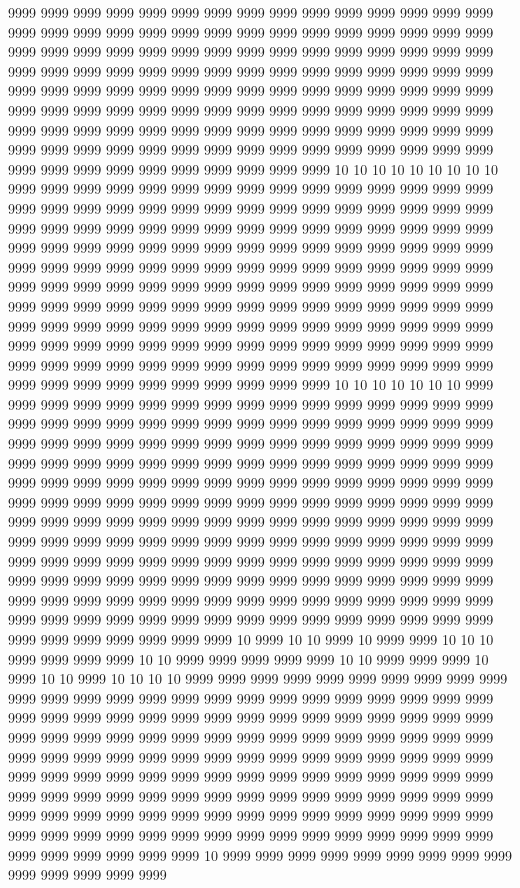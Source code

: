 9999 9999 9999 9999 9999 9999 9999 9999 9999 9999 9999 9999 9999 9999 9999 9999 9999 9999 9999 9999 9999 9999 9999 9999 9999 9999 9999 9999 9999 9999 9999 9999 9999 9999 9999 9999 9999 9999 9999 9999 9999 9999 9999 9999 9999 9999 9999 9999 9999 9999 9999 9999 9999 9999 9999 9999 9999 9999 9999 9999 9999 9999 9999 9999 9999 9999 9999 9999 9999 9999 9999 9999 9999 9999 9999 9999 9999 9999 9999 9999 9999 9999 9999 9999 9999 9999 9999 9999 9999 9999 9999 9999 9999 9999 9999 9999 9999 9999 9999 9999 9999 9999 9999 9999 9999 9999 9999 9999 9999 9999 9999 9999 9999 9999 9999 9999 9999 9999 9999 9999 9999 9999 9999 9999 9999 9999 9999 9999 9999 9999 10 10 10 10 10 10 10 10 10 9999 9999 9999 9999 9999 9999 9999 9999 9999 9999 9999 9999 9999 9999 9999 9999 9999 9999 9999 9999 9999 9999 9999 9999 9999 9999 9999 9999 9999 9999 9999 9999 9999 9999 9999 9999 9999 9999 9999 9999 9999 9999 9999 9999 9999 9999 9999 9999 9999 9999 9999 9999 9999 9999 9999 9999 9999 9999 9999 9999 9999 9999 9999 9999 9999 9999 9999 9999 9999 9999 9999 9999 9999 9999 9999 9999 9999 9999 9999 9999 9999 9999 9999 9999 9999 9999 9999 9999 9999 9999 9999 9999 9999 9999 9999 9999 9999 9999 9999 9999 9999 9999 9999 9999 9999 9999 9999 9999 9999 9999 9999 9999 9999 9999 9999 9999 9999 9999 9999 9999 9999 9999 9999 9999 9999 9999 9999 9999 9999 9999 9999 9999 9999 9999 9999 9999 9999 9999 9999 9999 9999 9999 9999 9999 9999 9999 9999 9999 9999 9999 9999 9999 9999 9999 9999 9999 9999 9999 9999 9999 10 10 10 10 10 10 10 9999 9999 9999 9999 9999 9999 9999 9999 9999 9999 9999 9999 9999 9999 9999 9999 9999 9999 9999 9999 9999 9999 9999 9999 9999 9999 9999 9999 9999 9999 9999 9999 9999 9999 9999 9999 9999 9999 9999 9999 9999 9999 9999 9999 9999 9999 9999 9999 9999 9999 9999 9999 9999 9999 9999 9999 9999 9999 9999 9999 9999 9999 9999 9999 9999 9999 9999 9999 9999 9999 9999 9999 9999 9999 9999 9999 9999 9999 9999 9999 9999 9999 9999 9999 9999 9999 9999 9999 9999 9999 9999 9999 9999 9999 9999 9999 9999 9999 9999 9999 9999 9999 9999 9999 9999 9999 9999 9999 9999 9999 9999 9999 9999 9999 9999 9999 9999 9999 9999 9999 9999 9999 9999 9999 9999 9999 9999 9999 9999 9999 9999 9999 9999 9999 9999 9999 9999 9999 9999 9999 9999 9999 9999 9999 9999 9999 9999 9999 9999 9999 9999 9999 9999 9999 9999 9999 9999 9999 9999 9999 9999 9999 9999 9999 9999 9999 9999 9999 9999 9999 9999 9999 9999 9999 9999 9999 9999 9999 9999 9999 9999 9999 9999 9999 9999 9999 9999 9999 10 9999 10 10 9999 10 9999 9999 10 10 10 9999 9999 9999 9999 10 10 9999 9999 9999 9999 9999 10 10 9999 9999 9999 10 9999 10 10 9999 10 10 10 10 9999 9999 9999 9999 9999 9999 9999 9999 9999 9999 9999 9999 9999 9999 9999 9999 9999 9999 9999 9999 9999 9999 9999 9999 9999 9999 9999 9999 9999 9999 9999 9999 9999 9999 9999 9999 9999 9999 9999 9999 9999 9999 9999 9999 9999 9999 9999 9999 9999 9999 9999 9999 9999 9999 9999 9999 9999 9999 9999 9999 9999 9999 9999 9999 9999 9999 9999 9999 9999 9999 9999 9999 9999 9999 9999 9999 9999 9999 9999 9999 9999 9999 9999 9999 9999 9999 9999 9999 9999 9999 9999 9999 9999 9999 9999 9999 9999 9999 9999 9999 9999 9999 9999 9999 9999 9999 9999 9999 9999 9999 9999 9999 9999 9999 9999 9999 9999 9999 9999 9999 9999 9999 9999 9999 9999 9999 9999 9999 9999 9999 9999 9999 9999 9999 9999 9999 10 9999 9999 9999 9999 9999 9999 9999 9999 9999 9999 9999 9999 9999 9999 